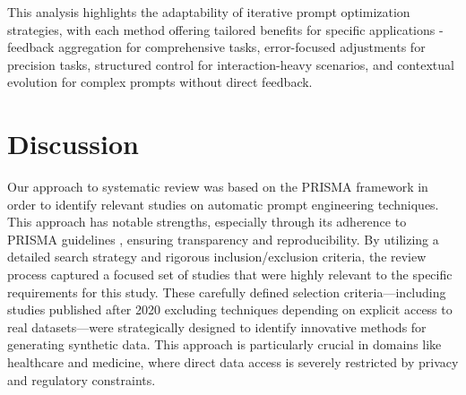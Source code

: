 \documentclass[runningheads]{llncs}
\begin{document}
This analysis highlights the adaptability of iterative prompt optimization strategies, with each method offering tailored benefits for specific applications - feedback aggregation for comprehensive tasks, error-focused adjustments for precision tasks, structured control for interaction-heavy scenarios, and contextual evolution for complex prompts without direct feedback. 




\section{Discussion}

Our approach to systematic review was based on the PRISMA framework in order to identify relevant studies on automatic prompt engineering techniques. This approach has notable strengths, especially through its adherence to PRISMA guidelines , ensuring transparency and reproducibility. By utilizing a detailed search strategy and rigorous inclusion/exclusion criteria, the review process captured a focused set of studies that were highly relevant to the specific requirements for this study. These carefully defined selection criteria—including studies published after 2020 excluding techniques depending on explicit access to real datasets—were strategically designed to identify innovative methods for generating synthetic data. This approach is particularly crucial in domains like healthcare and medicine, where direct data access is severely restricted by privacy and regulatory constraints.
\end{document}

